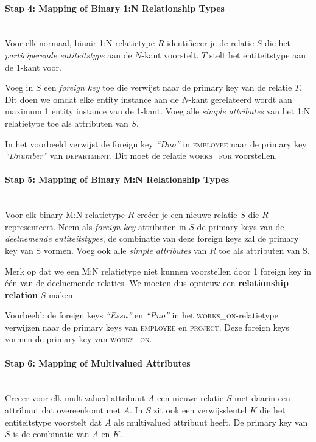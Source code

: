 \paragraph{Stap 4: Mapping of Binary 1:N Relationship Types}~\vspace{2mm}\\
Voor elk normaal, binair 1:N relatietype $R$ identificeer je de relatie $S$ die het \textit{participerende entiteitstype} aan de $N$-kant voorstelt. $T$ stelt het entiteitstype aan de 1-kant voor.

Voeg in $S$ een \textit{foreign key} toe die verwijst naar de primary key van de relatie $T$. Dit doen we omdat elke entity instance aan de $N$-kant gerelateerd wordt aan maximum 1 entity instance van de 1-kant. Voeg alle \textit{simple attributes} van het 1:N relatietype toe als attributen van $S$.

In het voorbeeld verwijst de foreign key \textit{``Dno''} in \textsc{employee} naar de primary key \textit{``Dnumber''} van \textsc{department}. Dit moet de relatie \textsc{works\_for} voorstellen.

\paragraph{Stap 5: Mapping of Binary M:N Relationship Types}~\vspace{2mm}\\
Voor elk binary M:N relatietype $R$ cre\"eer je een nieuwe relatie $S$ die $R$ representeert. Neem als \textit{foreign key} attributen in $S$ de primary keys van de \textit{deelnemende entiteitstypes},  de combinatie van deze foreign keys zal de primary key van S vormen. Voeg ook alle \textit{simple attributes} van $R$ toe als attributen van S.

Merk op dat we een M:N relatietype niet kunnen voorstellen door 1 foreign key in \'e\'en van de deelnemende relaties. We moeten dus opnieuw een \textbf{relationship relation} $S$ maken.

Voorbeeld: de foreign keys \textit{``Essn''} en \textit{``Pno''} in het \textsc{works\_on}-relatietype verwijzen naar de primary keys van \textsc{employee} en \textsc{project}. Deze foreign keys vormen de primary key van \textsc{works\_on}.

\paragraph{Stap 6: Mapping of Multivalued Attributes}~\vspace{2mm}\\
Cre\"eer voor elk multivalued attribuut $A$ een nieuwe relatie $S$ met daarin een attribuut dat overeenkomt met $A$. In $S$ zit ook een verwijssleutel $K$ die het entiteitstype voorstelt dat $A$ als multivalued attribuut heeft. De primary key van $S$ is de combinatie van $A$ en $K$.

